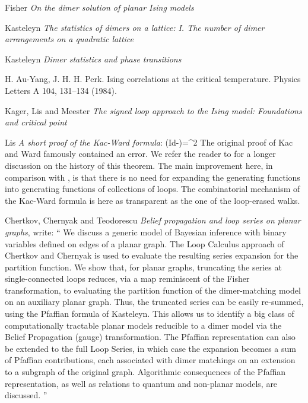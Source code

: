 \begin{description}
{Fisher
{\em On the dimer solution of planar Ising models}

Kasteleyn
{\em The statistics of dimers on a lattice:
    {I. The} number of dimer arrangements on a quadratic lattice}

Kasteleyn
{\em Dimer statistics and phase transitions}

H.  Au-Yang,  J.  H.  H.  Perk.  Ising  correlations  at  the  critical  temperature.
Physics Letters A 104, 131–134 (1984).

Kager, Lis and Meester
{\em The  signed  loop  approach  to  the  Ising  model:
Foundations and critical point}

Lis
{\em A short proof of the {Kac-Ward} formula}:
\beq
\det(Id-\Lambda)=\integers^2
The original proof of Kac and Ward famously contained an
error. We refer the reader to  for a longer discussion
on the history of this theorem. The main improvement here, in comparison
with ,  is that there is no need for expanding the
generating functions into generating functions of collections of loops.
The combinatorial mechanism of the Kac-Ward formula is here as
transparent as the one of the loop-erased walks.

Chertkov, Chernyak and Teodorescu
{\em Belief propagation and loop series on planar graphs},
write: ``
We discuss a generic model of Bayesian inference with binary variables
defined on edges of a planar graph. The Loop Calculus approach of
Chertkov and Chernyak is used to evaluate the
resulting series expansion for the partition function. We show that, for
planar graphs, truncating the series at single-connected loops reduces,
via a map reminiscent of the Fisher transformation, to
evaluating the partition function of the dimer-matching model on an
auxiliary planar graph. Thus, the truncated series can be easily
re-summed, using the Pfaffian formula of Kasteleyn. This
allows us to identify a big class of computationally tractable planar
models reducible to a dimer model via the Belief Propagation (gauge)
transformation. The Pfaffian representation can also be extended to the
full Loop Series, in which case the expansion becomes a sum of Pfaffian
contributions, each associated with dimer matchings on an extension to a
subgraph of the original graph. Algorithmic consequences of the Pfaffian
representation, as well as relations to quantum and non-planar models,
are discussed.
''

}
\end{description}
